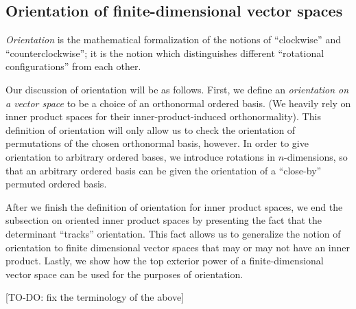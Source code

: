 \newpage

\subsection*{Orientation of finite-dimensional vector spaces}
\label{ch::lin_alg::section::orientation}

\textit{Orientation} is the mathematical formalization of the notions of ``clockwise'' and ``counterclockwise''; it is the notion which distinguishes different ``rotational configurations'' from each other.

Our discussion of orientation will be as follows. First, we define an \textit{orientation on a vector space} to be a choice of an orthonormal ordered basis. (We heavily rely on inner product spaces for their inner-product-induced orthonormality). This definition of orientation will only allow us to check the orientation of permutations of the chosen orthonormal basis, however. In order to give orientation to arbitrary ordered bases, we introduce rotations in $n$-dimensions, so that an arbitrary ordered basis can be given the orientation of a ``close-by'' permuted ordered basis.

After we finish the definition of orientation for inner product spaces, we end the subsection on oriented inner product spaces by presenting the fact that the determinant ``tracks'' orientation. This fact allows us to generalize the notion of orientation to finite dimensional vector spaces that may or may not have an inner product. Lastly, we show how the top exterior power of a finite-dimensional vector space can be used for the purposes of orientation.

[TO-DO: fix the terminology of the above]

